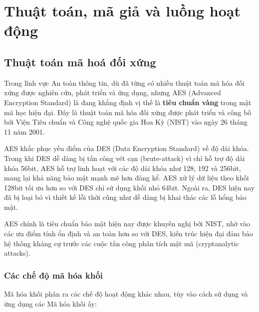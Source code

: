 
\chapter{Thuật toán, mã giả và luồng hoạt động}


\section{Thuật toán mã hoá đối xứng}

Trong lĩnh vực An toàn thông tin, dù đã từng có nhiều thuật toán mã hóa đối xứng được nghiên cứu, phát triển và ứng dụng, nhưng AES (Advanced Encryption Standard) là đang khẳng định vị thế là \textbf{tiêu chuẩn vàng} trong mật mã học hiện đại. Đây là thuật toán mã hóa đối xứng được phát triển và công bố bởi Viện Tiêu chuẩn và Công nghệ quốc gia Hoa Kỳ (NIST) vào ngày 26 tháng 11 năm 2001. \nocite{1250456}


AES khắc phục yếu điểm của DES (Data Encryption Standard) về độ dài khóa. Trong khi DES dễ dàng bị tấn công vét cạn (brute-attack) vì chỉ hỗ trợ độ dài khóa 56bit, AES hỗ trợ linh hoạt với các độ dài khóa như 128, 192 và 256bit, mang lại khả năng bảo mật mạnh mẽ hơn đáng kể. AES xử lý dữ liệu theo khối 128bit tối ưu hơn so với DES chỉ sử dụng khối nhỏ 64bit. Ngoài ra, DES hiện nay đã bị loại bỏ vì thiết kế lỗi thời cũng như dễ dàng bị khai thác các lỗ hổng bảo mật.

AES chính là tiêu chuẩn bảo mật hiện nay được khuyến nghị bởi NIST, nhờ vào các ưu điểm tính ổn định và an toàn hơn so với DES, kiến trúc hiện đại đảm bảo hệ thống kháng cự trước các cuộc tấn công phân tích mật mã (cryptanalytic attacks). \nocite{geeksforgeeks_2025b}

\subsection{Các chế độ mã hóa khối}

Mã hóa khối phân ra các chế độ hoạt động khác nhau, tùy vào cách sử dụng và ứng dụng các Mã hóa khối ấy:


